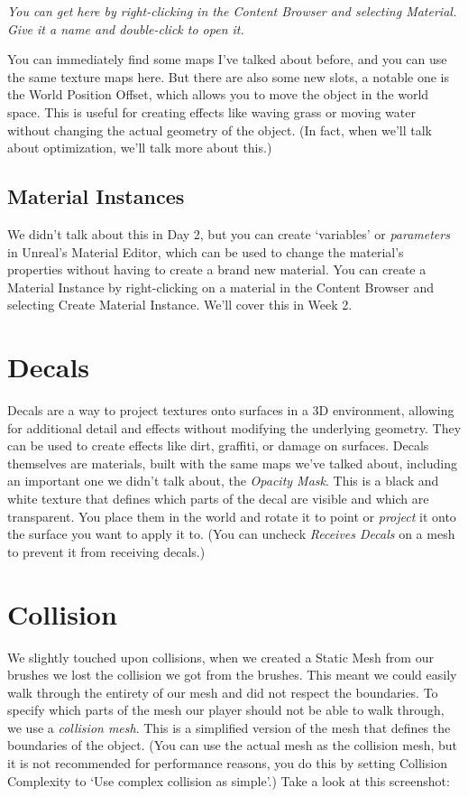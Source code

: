 \documentclass{article}
\begin{document}
\textit{You can get here by right-clicking in the Content Browser and selecting Material. Give it a name and double-click to open it.}

You can immediately find some maps I've talked about before, and you can use the same texture maps here. But there are also some new slots, a notable one is the World Position Offset, which allows you to move the object in the world space. This is useful for creating effects like waving grass or moving water without changing the actual geometry of the object. (In fact, when we'll talk about optimization, we'll talk more about this.)

\subsection{Material Instances}
We didn't talk about this in Day 2, but you can create `variables' or \textit{parameters} in Unreal's Material Editor, which can be used to change the material's properties without having to create a brand new material. You can create a Material Instance by right-clicking on a material in the Content Browser and selecting Create Material Instance. We'll cover this in Week 2.

\section{Decals}

Decals are a way to project textures onto surfaces in a 3D environment, allowing for additional detail and effects without modifying the underlying geometry. They can be used to create effects like dirt, graffiti, or damage on surfaces. Decals themselves are materials, built with the same maps we've talked about, including an important one we didn't talk about, the \textit{Opacity Mask}. This is a black and white texture that defines which parts of the decal are visible and which are transparent. You place them in the world and rotate it to point or \emph{project} it onto the surface you want to apply it to. (You can uncheck \emph{Receives Decals} on a mesh to prevent it from receiving decals.)

\section{Collision}

We slightly touched upon collisions, when we created a Static Mesh from our brushes we lost the collision we got from the brushes. This meant we could easily walk through the entirety of our mesh and did not respect the boundaries. To specify which parts of the mesh our player should not be able to walk through, we use a \textit{collision mesh}. This is a simplified version of the mesh that defines the boundaries of the object. (You can use the actual mesh as the collision mesh, but it is not recommended for performance reasons, you do this by setting Collision Complexity to `Use complex collision as simple'.) Take a look at this screenshot:
\end{document}
